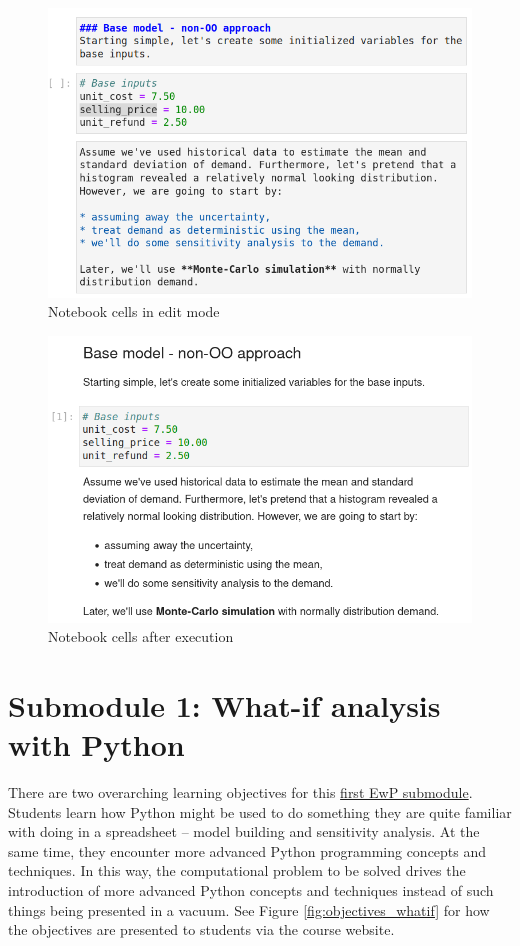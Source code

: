 \documentclass[ited,blindrev]{informs3}              %
\begin{document}
\begin{figure}[!htbp]
\centering
\includegraphics[scale=0.5]{cells_edit_mode}
\caption{Notebook cells in edit mode}
\label{fig:cells_edit_mode}
\end{figure}

\begin{figure}[!htbp]
\centering
\includegraphics[scale=0.5]{cells_after_running}
\caption{Notebook cells after execution}
\label{fig:cells_after_running}
\end{figure}


\section{Submodule 1: What-if analysis with Python}

There are two overarching learning objectives for this \href{http://www.sba.oakland.edu/faculty/isken/courses/aap/mod3a_whatif.html}{first EwP submodule}. Students learn how Python might be used to do something they are quite familiar with doing in a spreadsheet -- model building and sensitivity analysis. At the same time, they encounter more advanced Python programming concepts and techniques. In this way, the computational problem to be solved drives the introduction of more advanced Python concepts and techniques instead of such things being presented in a vacuum. See Figure \ref{fig:objectives_whatif} for how the objectives are presented to students via the course website.
\end{document}
